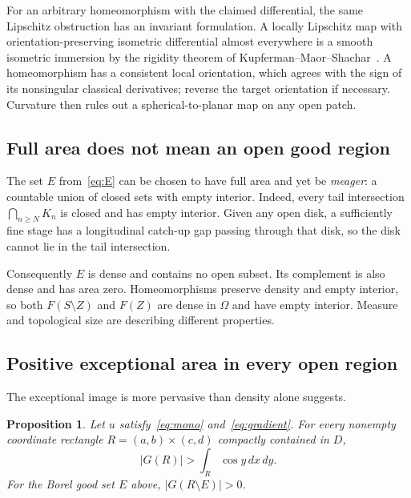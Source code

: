\documentclass[11pt,letterpaper]{article}
\numberwithin{equation}{section}
\newtheorem{proposition}[theorem]{Proposition}
\theoremstyle{remark}
\begin{document}
For an arbitrary homeomorphism with the claimed differential, the same Lipschitz obstruction has an invariant formulation. A locally Lipschitz map with orientation-preserving isometric differential almost everywhere is a smooth isometric immersion by the rigidity theorem of Kupferman--Maor--Shachar~\cite[Theorem 1.1]{kms}. A homeomorphism has a consistent local orientation, which agrees with the sign of its nonsingular classical derivatives; reverse the target orientation if necessary. Curvature then rules out a spherical-to-planar map on any open patch.

\subsection{Full area does not mean an open good region}

The set $E$ from~\eqref{eq:E} can be chosen to have full area and yet be \emph{meager}: a countable union of closed sets with empty interior. Indeed, every tail intersection $\bigcap_{n\ge N}K_n$ is closed and has empty interior. Given any open disk, a sufficiently fine stage has a longitudinal catch-up gap passing through that disk, so the disk cannot lie in the tail intersection.

Consequently $E$ is dense and contains no open subset. Its complement is also dense and has area zero. Homeomorphisms preserve density and empty interior, so both $F(S\setminus Z)$ and $F(Z)$ are dense in $\Omega$ and have empty interior. Measure and topological size are describing different properties.

\subsection{Positive exceptional area in every open region}

The exceptional image is more pervasive than density alone suggests.

\begin{proposition}\label{prop:localexcess}
Let $u$ satisfy~\eqref{eq:mono} and~\eqref{eq:gradient}. For every nonempty coordinate rectangle $R=(a,b)\times(c,d)$ compactly contained in $D$,
\[
 |G(R)|>\int_R\cos y\,dx\,dy.
\]
For the Borel good set $E$ above, $|G(R\setminus E)|>0$.
\end{proposition}
\end{document}
